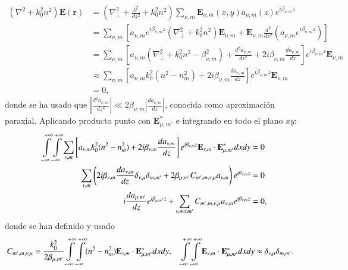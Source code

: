 \begin{align}
	(\nabla^2  + k_0^2n^2) \textbf{E}(\textbf{r}) &= \left(\nabla_\perp^2 + \frac{\partial^2}{\partial z^2} + k_0^2n^2 \right)\sum_{\nu, m} \textbf{E}_{\nu, m}(x, y) a_{\nu, m}(z) e^{i\beta_{\nu, m} z}
	\nonumber
	\\
	&= \sum_{\nu, m} \left[a_{\nu, m} e^{i\beta_{\nu, m} z} \left(\nabla_\perp^2 +k_0^2n^2 \right)\textbf{E}_{\nu, m} + \textbf{E}_{\nu, m}\frac{d^2}{d z^2}\left(a_{\nu, m} e^{i\beta_{\nu, m} z}\right)\right]
	\nonumber	
	\\
	&= \sum_{\nu, m} \left[a_{\nu, m}  \left(\nabla_\perp^2 +k_0^2n^2 -\beta_{\nu,m}^2 \right) + \frac{d^2 a_{\nu, m}}{d z^2}  +2i\beta_{\nu,m}\frac{d a_{\nu, m}}{d z} \right]e^{i\beta_{\nu, m} z}\textbf{E}_{\nu, m}
		\nonumber	
	\\
	&\approx \sum_{\nu, m} \left[a_{\nu, m}  k_0^2(n^2 - n^2_{m}) +2i\beta_{\nu,m}\frac{d a_{\nu, m}}{d z} \right]e^{i\beta_{\nu, m} z}\textbf{E}_{\nu, m}
	\nonumber	
	\\
	&= 0,
	\nonumber	
\end{align}
donde se ha usado que $\left|\frac{d^2 a_{\nu, m}}{d z^2}\right|\ll 2\beta_{\nu,m}\left|\frac{d a_{\nu, m}}{d z}\right|  $, conocida como aproximación paraxial. Aplicando producto punto con $\textbf{E}_{\mu, m'}^*$ e integrando en todo el plano $xy$:
\begin{align}
	  \int\displaylimits_{-\infty}^{+\infty}\int\displaylimits_{-\infty}^{+\infty} \sum_{\nu, m} \left[a_{\nu, m}  k_0^2(n^2 - n^2_{m}) +2i\beta_{\nu,m}\frac{d a_{\nu, m}}{d z} \right]e^{i\beta_{\nu, m} z}\textbf{E}_{\nu, m} \cdot \textbf{E}_{\mu, m'}^* dxdy &= 0
	  \nonumber
	  \\
	  \sum_{\nu, m} \left(2i\beta_{\nu,m}\frac{d a_{\nu, m}}{d z} \delta_{\nu,\mu}\delta_{m,m'} +  2\beta_{\mu, m'}C_{m', m, \nu, \mu}   a_{\nu, m} \right)e^{i\beta_{\nu, m} z} &= 0
	  \nonumber
	  \\
	  	  i\frac{d a_{\mu, m'}}{d z} e^{i\beta_{\mu, m'} z} +  \sum_{\nu, m\neq m'}C_{m', m, \nu, \mu}   a_{\nu, m} e^{i\beta_{\nu, m} z} &= 0,
	  	  \nonumber
\end{align}
donde se han definido y usado
\begin{align*}
	   C_{m', m, \nu, \mu} &\equiv \frac{k_0^2}{2\beta_{\mu, m'}}\int\displaylimits_{-\infty}^{+\infty}\int\displaylimits_{-\infty}^{+\infty} (n^2 - n^2_{m}) \textbf{E}_{\nu, m} \cdot \textbf{E}_{\mu, m'}^* dxdy , \quad\int\displaylimits_{-\infty}^{+\infty}\int\displaylimits_{-\infty}^{+\infty} \textbf{E}_{\nu, m} \cdot \textbf{E}_{\mu, m'}^* dxdy \approx \delta_{\nu,\mu}\delta_{m,m'}.
\end{align*}


